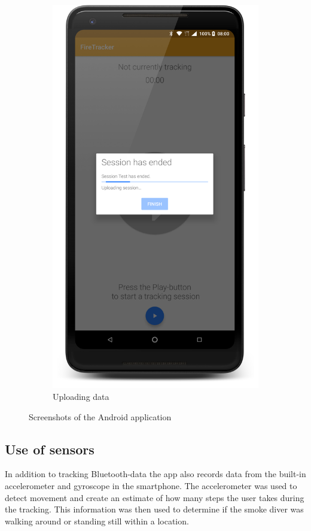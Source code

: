 \documentclass[../Main/thesis.tex]{subfiles}
\begin{document}
\begin{figure}[h]
\begin{subfigure}{0.2\textwidth}
		\includegraphics[width=\textwidth]{../fig/firetracker_app_old_4}
		\caption{Uploading data}
		\label{fig:app-first-prototype-upload}
	\end{subfigure}
	\caption{Screenshots of the Android application}
	\label{fig:app-first-prototype}
\end{figure}

\subsection*{Use of sensors}
In addition to tracking Bluetooth-data the app also records data from the built-in accelerometer and gyroscope in the smartphone.
The accelerometer was used to detect movement and create an estimate of how many steps the user takes during the tracking.
This information was then used to determine if the smoke diver was walking around or standing still within a location.
\end{document}
